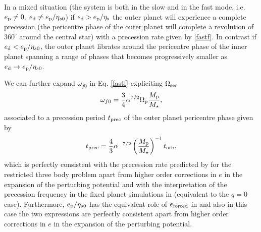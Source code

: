\documentclass[usenatbib,a4paper,times,fleqn]{mnras}
\begin{document}
In a mixed situation (the system is both in the slow and in the fast mode, i.e. $e_{\rm p}\neq 0,\;e_{\rm d}\neq e_{\rm p}/\eta_{s0}$)  if $e_{\rm d}>e_{\rm p}/\eta_{\rm s}$ the outer planet will experience a complete precession (the pericentre phase of the outer planet will complete a revolution of $360^\circ$ around the central star) with a precession rate given by \ref{fastf}. In contrast if $e_{\rm d}<e_{\rm p}/\eta_{s0}$, the outer planet librates around the pericentre phase of the inner planet spanning a range of phases that becomes progressively smaller as $e_{\rm d}\rightarrow e_{\rm p}/\eta_{s0}$.

We can further expand $\omega_{f0}$ in Eq. \ref{fastf} expliciting $\Omega_{\rm sec}$
\begin{equation}
\omega_{f0}=\frac{3}{4}\alpha^{7/2} \Omega_{\rm p}\frac{M_{\rm p}}{M_\star},\label{omefqzero}
\end{equation}
associated to a precession period $t_{\rm prec}$ of the outer planet pericentre phase given by
\begin{equation}
t_ {\rm prec}=\frac{4}{3}\alpha^{-7/2}\left(\frac{M_{\rm p}}{M_\star}\right)^{-1}t_{\rm orb},
\end{equation}
which is perfectly consistent with the precession rate predicted by \citet{moriwaki2004} for the restricted three body problem apart from higher order corrections in $e$ in the expansion of the perturbing potential and with the interpretation of the precession frequency in the fixed planet simulations in \citet{thun2017} (equivalent to the $q=0$ case).
Furthermore, $e_{\rm p}/\eta_{s0}$ has the equivalent role of $e_{\rm forced}$ in \citet{moriwaki2004} and also in this case the two expressions are perfectly consistent apart from higher order corrections in $e$ in the expansion of the perturbing potential.
\end{document}
